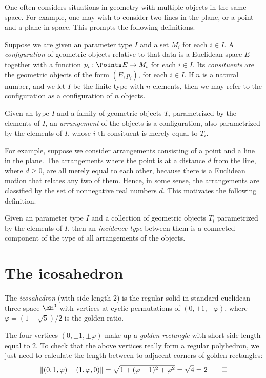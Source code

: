 One often considers situations in geometry with multiple objects in the same
space.  For example, one may wish to consider two lines in the plane, or a
point and a plane in space.  This prompts the following definitions.

\begin{definition}
  Suppose we are given an parameter type $I$ and a set $M_i$ for each $i\in I$.  A
  {\em configuration} of geometric objects relative to that data is a Euclidean
  space $E$ together with a function $p_i : \Points E \to M_i$ for each
  $i\in I$.  Its {\em consituents} are the geometric objects of the form
  $(E,p_i)$, for each $i \in I$.  If $n$ is a natural number, and we let $I$ be
  the finite type with $n$ elements, then we may refer to the configuration as
  a configuration of $n$ objects.  
\end{definition}

\begin{definition}
  Given an type $I$ and a family of geometric objects $T_i$ parametrized
  by the elements of $I$, an {\em arrangement} of the objects is a
  configuration, also parametrized by the elements of $I$, whose $i$-th consituent is merely equal to
  $T_i$.
\end{definition}

For example, suppose we consider arrangements consisting of a point and a line
in the plane.  The arrangements where the point is at a distance $d$ from the
line, where $d \ge 0$, are all merely equal to each other, because there is a
Euclidean motion that relates any two of them.  Hence, in some sense, the
arrangements are classified by the set of nonnegative real numbers $d$.  This
motivates the following definition.

\begin{definition}
  Given an parameter type $I$ and a collection of geometric objects $T_i$ parametrized
  by the elements of $I$, then an {\em incidence type} between them is a
  connected component of the type of all arrangements of the objects.
\end{definition}

\section{The icosahedron}

\begin{definition}
  The \emph{icosahedron} (with side length $2$)
  is the regular solid in standard euclidean
  three-space $\EE^3$ with vertices at cyclic permutations of
  $(0,\pm1,\pm\varphi)$, where $\varphi = (1+\sqrt5)/2$ is the golden ratio.
\end{definition}
\begin{remark}
  The four vertices $(0,\pm1,\pm\varphi)$ make up a \emph{golden rectangle}
  with short side length equal to $2$. To check that the above vertices really form a regular polyhedron, we just need to calculate the length between to adjacent corners of golden rectangles:
  \[
    \lVert(0,1,\varphi)-(1,\varphi,0)\rVert
    = \sqrt{1 + (\varphi-1)^2 + \varphi^2}
    = \sqrt{4} = 2\qedhere
  \]
\end{remark}

